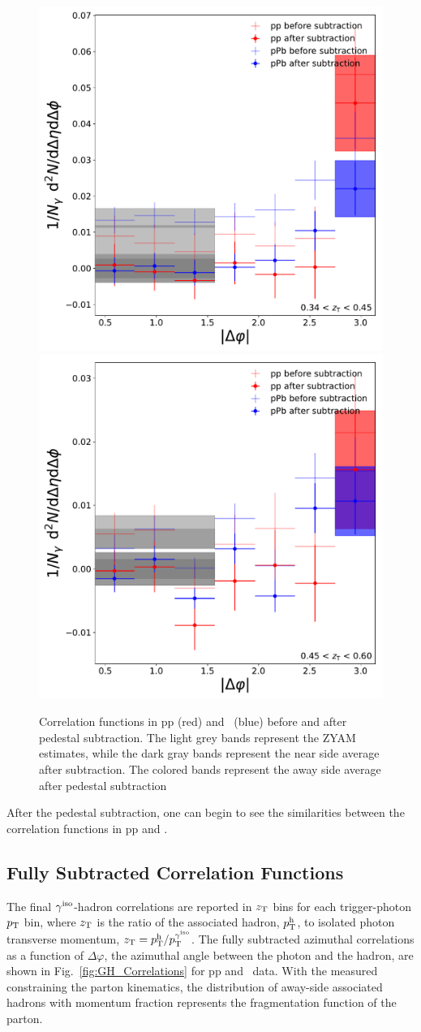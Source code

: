 \begin{figure}
\includegraphics[width = 0.24 \textwidth]{G-H_New/Befor_After_UE_pp-pPb_pT_0_zT_6.pdf}
\includegraphics[width = 0.24 \textwidth]{G-H_New/Befor_After_UE_pp-pPb_pT_0_zT_7.pdf}
\caption{Correlation functions in pp (red) and \pPb~(blue) before and after pedestal subtraction. The light grey bands represent the ZYAM estimates, while the dark gray bands represent the near side average after subtraction. The colored bands represent the away side average after pedestal subtraction}
\label{fig:BF_UE_zT_second}
\end{figure}

After the pedestal subtraction, one can begin to see the similarities between the correlation functions in pp and \pPb.


\subsection{Fully Subtracted Correlation Functions}
\label{sec:decaybkgsubtraction}
The final $ \gamma^\mathrm{iso}$-hadron correlations are reported in $z_{\mathrm{T}}$  bins for each trigger-photon $p_{\mathrm{T}}$ bin, where $z_{\mathrm{T}}$ is the ratio of the associated hadron, $p_{\mathrm{T}}^\mathrm{h}$, to isolated photon transverse momentum, $z_{\mathrm{T}} = p_{\mathrm{T}}^{\mathrm{h}}/p_{\mathrm{T}}^{\gamma^\mathrm{iso}}$. The fully subtracted azimuthal correlations as a function of $ \Delta\varphi$, the azimuthal angle between the photon and the hadron, are shown in Fig.~\ref{fig:GH_Correlations} for pp and \pPb~data. With the measured \gammaiso~ constraining the parton kinematics, the distribution of away-side associated hadrons with momentum fraction \zt represents the fragmentation function of the parton.

